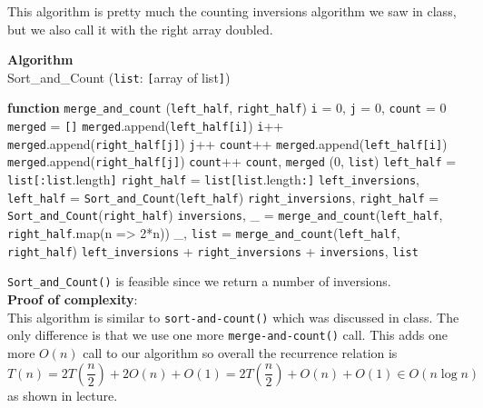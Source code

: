 \documentclass[12pt]{article}
\begin{document}
This algorithm is pretty much the counting inversions algorithm we saw in class, but we also call
it with the right array doubled.
\begin{algorithm}
	\caption*{\textbf{Algorithm}\\Sort\_and\_Count \big(\texttt{list}: \texttt{[}array of list\texttt{]}\big)}\label{alg:cap}
	\begin{algorithmic}[1]
		\State \textbf{function} \texttt{merge\_and\_count} (\texttt{left\_half}, \texttt{right\_half})\Indent
			\State \texttt{i} = 0, \texttt{j} = 0, \texttt{count} = 0
			\State \texttt{merged} = \texttt{[]}
			\State
				\State \texttt{merged}.append(\texttt{left\_half[i]})
					\State \texttt{i}++
				\EndIf
					\State \texttt{merged}.append(\texttt{right\_half[j]})  
					\State \texttt{j}++
					\State \texttt{count}++
				\EndIf
					\State \texttt{merged}.append(\texttt{left\_half[i]})
				\Else
					\State \texttt{merged}.append(\texttt{right\_half[j]})  
					\State \texttt{count}++
				\EndIf
			\EndWhile
			\State\Return \texttt{count}, \texttt{merged}
		\EndIndent
		\State
			\State\Return \big(0, \texttt{list}\big)
		\EndIf
		\State
		\State \texttt{left\_half} = \texttt{list[:list}.length\texttt{]}
		\State \texttt{right\_half} = \texttt{list[list}.length\texttt{:]}
		\State
		\State \texttt{left\_inversions}, \texttt{left\_half} = \texttt{Sort\_and\_Count}(\texttt{left\_half})
		\State \texttt{right\_inversions}, \texttt{right\_half} = \texttt{Sort\_and\_Count}(\texttt{right\_half})
		\State
		\State \texttt{inversions}, \_ = \texttt{merge\_and\_count}\big(\texttt{left\_half}, \texttt{right\_half}.map(n => 2*n)\big)
		\State \_, \texttt{list} = \texttt{merge\_and\_count}(\texttt{left\_half}, \texttt{right\_half})
		\State\Return \texttt{left\_inversions} + \texttt{right\_inversions} + \texttt{inversions}, \texttt{list}
	\end{algorithmic}
\end{algorithm}

\newpage
\texttt{Sort\_and\_Count()} is feasible since we return a number of inversions.\\

\textbf{Proof of complexity}:\\
This algorithm is similar to \texttt{sort-and-count()} which was discussed in class.
The only difference is that we use one more \texttt{merge-and-count()} call.
This adds one more $O(n)$ call to our algorithm so overall the recurrence relation is
$$T(n) = 2T\left(\frac{n}{2}\right) + 2O(n) + O(1) = 2T\left(\frac{n}{2}\right) + O(n) + O(1) \in O(n\log n)$$
as shown in lecture.\\
\end{document}
